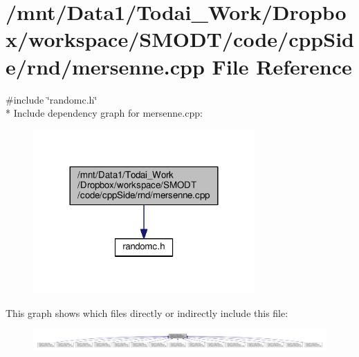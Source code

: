 \section{/mnt/\-Data1/\-Todai\-\_\-\-Work/\-Dropbox/workspace/\-S\-M\-O\-D\-T/code/cpp\-Side/rnd/mersenne.cpp File Reference}
\label{rnd_2mersenne_8cpp}
{\ttfamily \#include \char`\"{}randomc.\-h\char`\"{}}\\*
Include dependency graph for mersenne.\-cpp\-:\nopagebreak
\begin{figure}[H]
\begin{center}
\leavevmode
\includegraphics[width=240pt]{rnd_2mersenne_8cpp__incl}
\end{center}
\end{figure}
This graph shows which files directly or indirectly include this file\-:\nopagebreak
\begin{figure}[H]
\begin{center}
\leavevmode
\includegraphics[width=350pt]{rnd_2mersenne_8cpp__dep__incl}
\end{center}
\end{figure}
